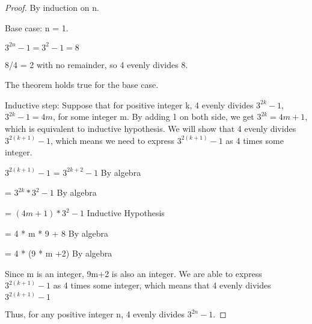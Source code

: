 \documentclass[11pt]{article}
\begin{document}
	\begin{proof}
	By induction on n.
	
	Base case: n = 1.
	
	$3^{2n}-1 = 3^2-1 = 8$
	
	8/4 = 2 with no remainder, so 4 evenly divides 8.
	
	The theorem holds true for the base case.
	
	Inductive step: Suppose that for positive integer k, 4 evenly divides $3^{2k}-1$, $3^{2k}-1=4m$, for some integer m. By adding 1 on both side, we get $3^{2k}=4m+1$, which is equivalent to inductive hypothesis. We will show that 4 evenly divides $3^{2(k+1)}-1$, which means we need to express $3^{2(k+1)}-1$ as 4 times some integer.
	
	$3^{2(k+1)}-1$ = $3^{2k+2}-1$\hspace{13.5mm} By algebra

\hspace{18.5mm} = $3^{2k}*3^2-1$\hspace{9.5mm} By algebra

\hspace{18.5mm} = $(4m+1)*3^2-1$ Inductive Hypothesis

\hspace{18.5mm} = 4 * m * 9 + 8\hspace{6mm} By algebra

\hspace{18.5mm} = 4 * (9 * m +2)\hspace{4.5mm} By algebra

Since m is an integer, 9m+2 is also an integer. We are able to express $3^{2(k+1)}-1$ as 4 times some integer, which means that 4 evenly divides $3^{2(k+1)}-1$

Thus, for any positive integer n, 4 evenly divides $3^{2n}-1$.


	\end{proof}
	

	
	
\end{document}
